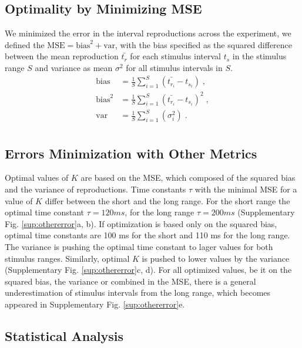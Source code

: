 \documentclass[10pt]{article}
\begin{document}
\subsection*{Optimality by Minimizing MSE}
We minimized the error in the interval reproductions across the experiment, we defined the $\text{MSE} = \text{bias}^2+\text{var}$, with the bias specified as the squared difference between the mean reproduction $\bar{t_{r}}$ for each stimulus interval $t_s$ in the stimulus range $S$ and variance as mean $\sigma^2$ for all stimulus intervals in $S$.
\begin{equation} \label{MSE}
	\begin{split}
	 \text{bias} & = \frac{1}{S} \sum \limits_{i=1}^{S} (\bar{t_{r_i}} - t_{s_i}) \;,\\
	 \text{bias}^2 & = \frac{1}{S} \sum \limits_{i=1}^{S}(\bar{t_{r_i}} - t_{s_i})^2 \;,\\
	 \text{var} & = \frac{1}{S} \sum \limits_{i=1}^{S}(\sigma_i^2) \;.\\
	\end{split}
\end{equation}

\subsection*{Errors Minimization with Other Metrics}
Optimal values of $K$ are based on the MSE, which composed of the squared bias and the variance of reproductions. 
Time constants $\tau$ with the minimal MSE for a value of $K$ differ between the short and the long range. For the short range the optimal time constant $\tau = 120 ms$, for the long range $\tau = 200 ms$ (Supplementary Fig. \ref{sup:othererror}a, b). If optimization is based only on the squared bias, optimal time constants are 100 ms for the short and 110 ms for the long range. 
The variance is pushing the optimal time constant to lager values for both stimulus ranges. 
Similarly, optimal $K$ is pushed to lower values by the variance (Supplementary Fig. \ref{sup:othererror}c, d).
For all optimized values, be it on the squared bias, the variance or combined in the MSE, there is a general underestimation of stimulus intervals from the long range, which becomes appeared in Supplementary Fig. \ref{sup:othererror}e.

\subsection*{Statistical Analysis}
\end{document}

